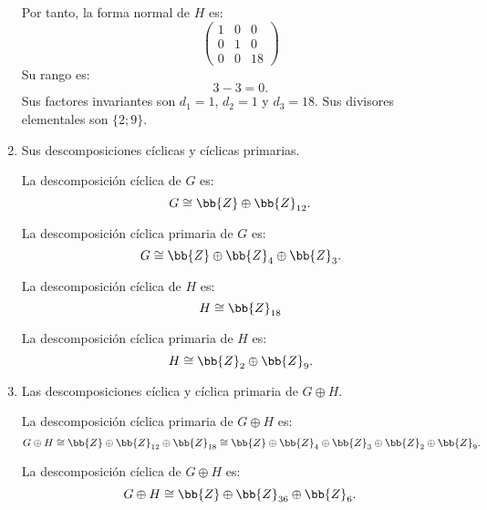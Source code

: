 \begin{ejercicio}
\begin{enumerate}
        Por tanto, la forma normal de $H$ es:
        \begin{equation*}
            \begin{pmatrix}
                1 & 0 & 0 \\
                0 & 1 & 0 \\
                0 & 0 & 18
            \end{pmatrix}
        \end{equation*}
        Su rango es:
        \begin{equation*}
            3-3= 0.
        \end{equation*}
        Sus factores invariantes son $d_1=1$, $d_2=1$ y $d_3=18$.
        Sus divisores elementales son $\{  2; 9\}$.


        \item Sus descomposiciones cíclicas y cíclicas primarias.
        
        La descomposición cíclica de $G$ es:
        \begin{equation*}
            G \cong \bb{Z} \oplus \bb{Z}_{12}.
        \end{equation*}

        La descomposición cíclica primaria de $G$ es:
        \begin{equation*}
            G \cong \bb{Z} \oplus \bb{Z}_4 \oplus \bb{Z}_3.
        \end{equation*}

        La descomposición cíclica de $H$ es:
        \begin{equation*}
            H \cong \bb{Z}_{18}
        \end{equation*}

        La descomposición cíclica primaria de $H$ es:
        \begin{equation*}
            H \cong \bb{Z}_2 \oplus \bb{Z}_9.
        \end{equation*}
        \item Las descomposiciones cíclica y cíclica primaria de $G \oplus H$.
        
        La descomposición cíclica primaria de $G \oplus H$ es:
        \begin{equation*}
            G \oplus H \cong \bb{Z} \oplus \bb{Z}_{12} \oplus \bb{Z}_{18} \cong \bb{Z} \oplus \bb{Z}_4 \oplus \bb{Z}_3 \oplus \bb{Z}_2 \oplus \bb{Z}_9.
        \end{equation*}

        La descomposición cíclica de $G \oplus H$ es:
        \begin{equation*}
            G \oplus H \cong \bb{Z} \oplus \bb{Z}_{36} \oplus \bb{Z}_{6}.
        \end{equation*}
    \end{enumerate}
\end{ejercicio}

